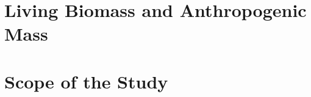 \section[Living Biomass and Anthropogenic Mass]{Living Biomass and Anthropogenic Mass}
\label{sec:living_biomass_and_anthropogenic_mass}

\clearpage

\section{Scope of the Study}
\label{sec:scope_of_the_study}

\clearpage

